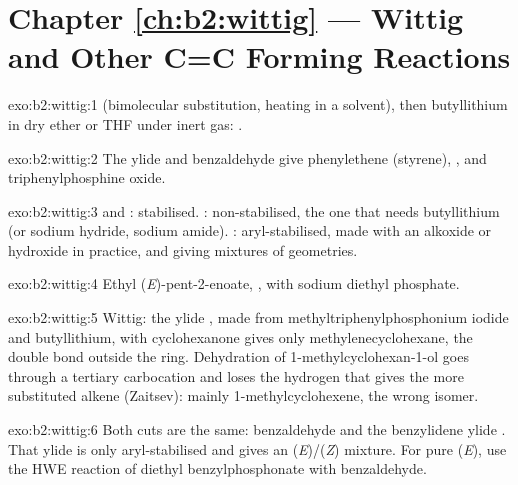 \section*{Chapter \ref{ch:b2:wittig} --- Wittig and Other C=C Forming Reactions}

\begin{solution}{exo:b2:wittig:1}
 (bimolecular substitution, heating in a solvent), then
butyllithium in dry ether or THF under inert gas: .
\end{solution}

\begin{solution}{exo:b2:wittig:2}
The ylide  and benzaldehyde give phenylethene (styrene), , and
triphenylphosphine oxide.
\end{solution}

\begin{solution}{exo:b2:wittig:3}
 and : stabilised. : non-stabilised, the one that
needs butyllithium (or sodium hydride, sodium amide). : aryl-stabilised, made with an
alkoxide or hydroxide in practice, and giving mixtures of geometries.
\end{solution}

\begin{solution}{exo:b2:wittig:4}
Ethyl (\textit{E})-pent-2-enoate, , with sodium diethyl phosphate.
\end{solution}

\begin{solution}{exo:b2:wittig:5}
Wittig: the ylide , made from methyltriphenylphosphonium iodide and butyllithium, with cyclohexanone gives only
methylenecyclohexane, the double bond outside the ring. Dehydration of 1-methylcyclohexan-1-ol goes
through a tertiary carbocation and loses the hydrogen that gives the more substituted alkene (Zaitsev):
mainly 1-methylcyclohexene, the wrong isomer.
\end{solution}

\begin{solution}{exo:b2:wittig:6}
Both cuts are the same: benzaldehyde and the benzylidene ylide . That ylide is only
aryl-stabilised and gives an (\textit{E})/(\textit{Z}) mixture. For pure (\textit{E}), use the HWE
reaction of diethyl benzylphosphonate with benzaldehyde.
\end{solution}

